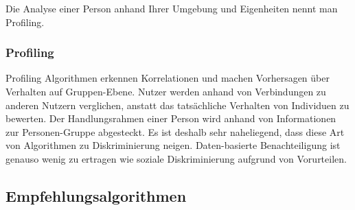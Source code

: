 Die Analyse einer Person anhand Ihrer Umgebung und Eigenheiten nennt man Profiling. 

\subsubsection{Profiling}


Profiling Algorithmen erkennen Korrelationen und machen Vorhersagen über Verhalten auf Gruppen-Ebene. Nutzer werden anhand von Verbindungen zu anderen Nutzern verglichen, anstatt das tatsächliche Verhalten von Individuen zu bewerten. Der Handlungsrahmen einer Person wird anhand von Informationen zur Personen-Gruppe abgesteckt. Es ist deshalb sehr naheliegend, dass diese Art von Algorithmen zu Diskriminierung neigen. Daten-basierte Benachteiligung ist genauso wenig zu ertragen wie soziale Diskriminierung aufgrund von Vorurteilen. 

\subsection{Empfehlungsalgorithmen}


